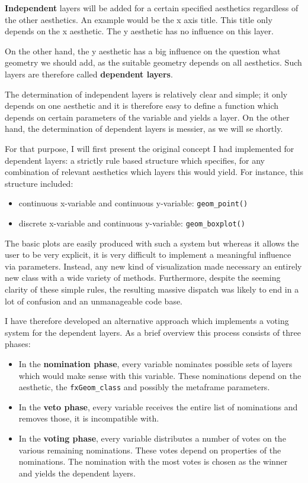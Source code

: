 \documentclass[]{report}
\providecommand{\tightlist}{%
  \setlength{\itemsep}{0pt}\setlength{\parskip}{0pt}}
\theoremstyle{definition}
\theoremstyle{definition}
\theoremstyle{definition}
\theoremstyle{remark}
\begin{document}
\textbf{Independent} layers will be added for a certain specified
aesthetics regardless of the other aesthetics. An example would be the x
axis title. This title only depends on the x aesthetic. The y aesthetic
has no influence on this layer.

On the other hand, the y aesthetic has a big influence on the question
what geometry we should add, as the suitable geometry depends on all
aesthetics. Such layers are therefore called \textbf{dependent layers}.

The determination of independent layers is relatively clear and simple;
it only depends on one aesthetic and it is therefore easy to define a
function which depends on certain parameters of the variable and yields
a layer. On the other hand, the determination of dependent layers is
messier, as we will se shortly.

For that purpose, I will first present the original concept I had
implemented for dependent layers: a strictly rule based structure which
specifies, for any combination of relevant aesthetics which layers this
would yield. For instance, this structure included:

\begin{itemize}
\tightlist
\item
  continuous x-variable and continuous y-variable:
  \texttt{geom\_point()}
\item
  discrete x-variable and continuous y-variable:
  \texttt{geom\_boxplot()}
\end{itemize}

The basic plots are easily produced with such a system but whereas it
allows the user to be very explicit, it is very difficult to implement a
meaningful influence via parameters. Instead, any new kind of
visualization made necessary an entirely new class with a wide variety
of methods. Furthermore, despite the seeming clarity of these simple
rules, the resulting massive dispatch was likely to end in a lot of
confusion and an unmanageable code base.

I have therefore developed an alternative approach which implements a
voting system for the dependent layers. As a brief overview this process
consists of three phases:

\begin{itemize}
\tightlist
\item
  In the \textbf{nomination phase}, every variable nominates possible
  sets of layers which would make sense with this variable. These
  nominations depend on the aesthetic, the \texttt{fxGeom\_class} and
  possibly the metaframe parameters.
\item
  In the \textbf{veto phase}, every variable receives the entire list of
  nominations and removes those, it is incompatible with.
\item
  In the \textbf{voting phase}, every variable distributes a number of
  votes on the various remaining nominations. These votes depend on
  properties of the nominations. The nomination with the most votes is
  chosen as the winner and yields the dependent layers.
\end{itemize}
\end{document}
